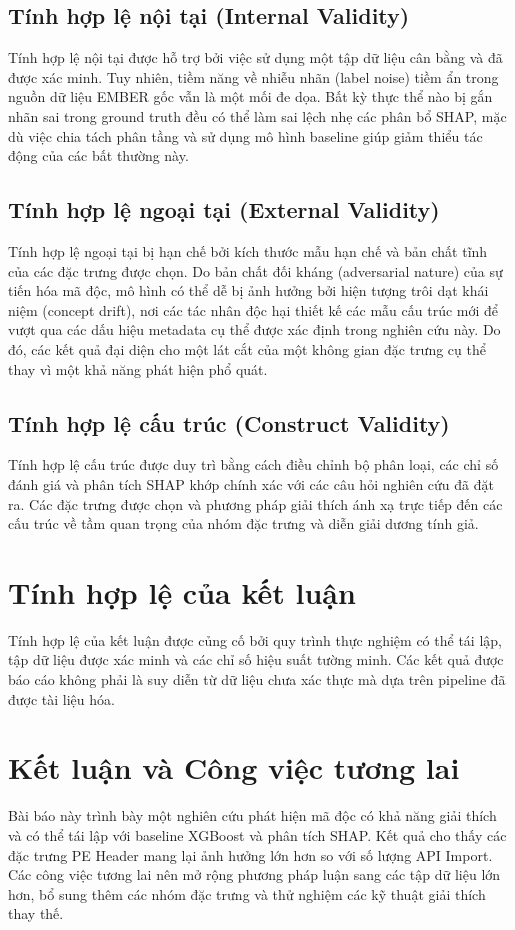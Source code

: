 \documentclass[conference]{IEEEtran}
\begin{document}
\subsection{Tính hợp lệ nội tại (Internal Validity)}
Tính hợp lệ nội tại được hỗ trợ bởi việc sử dụng một tập dữ liệu cân bằng và đã được xác minh. Tuy nhiên, tiềm năng về nhiễu nhãn (label noise) tiềm ẩn trong nguồn dữ liệu EMBER gốc vẫn là một mối đe dọa. Bất kỳ thực thể nào bị gắn nhãn sai trong ground truth đều có thể làm sai lệch nhẹ các phân bổ SHAP, mặc dù việc chia tách phân tầng và sử dụng mô hình baseline giúp giảm thiểu tác động của các bất thường này.

\subsection{Tính hợp lệ ngoại tại (External Validity)}
Tính hợp lệ ngoại tại bị hạn chế bởi kích thước mẫu hạn chế và bản chất tĩnh của các đặc trưng được chọn. Do bản chất đối kháng (adversarial nature) của sự tiến hóa mã độc, mô hình có thể dễ bị ảnh hưởng bởi hiện tượng trôi dạt khái niệm (concept drift), nơi các tác nhân độc hại thiết kế các mẫu cấu trúc mới để vượt qua các dấu hiệu metadata cụ thể được xác định trong nghiên cứu này. Do đó, các kết quả đại diện cho một lát cắt của một không gian đặc trưng cụ thể thay vì một khả năng phát hiện phổ quát.

\subsection{Tính hợp lệ cấu trúc (Construct Validity)}
Tính hợp lệ cấu trúc được duy trì bằng cách điều chỉnh bộ phân loại, các chỉ số đánh giá và phân tích SHAP khớp chính xác với các câu hỏi nghiên cứu đã đặt ra. Các đặc trưng được chọn và phương pháp giải thích ánh xạ trực tiếp đến các cấu trúc về tầm quan trọng của nhóm đặc trưng và diễn giải dương tính giả.

\section{Tính hợp lệ của kết luận}
Tính hợp lệ của kết luận được củng cố bởi quy trình thực nghiệm có thể tái lập, tập dữ liệu được xác minh và các chỉ số hiệu suất tường minh. Các kết quả được báo cáo không phải là suy diễn từ dữ liệu chưa xác thực mà dựa trên pipeline đã được tài liệu hóa.

\section{Kết luận và Công việc tương lai}
Bài báo này trình bày một nghiên cứu phát hiện mã độc có khả năng giải thích và có thể tái lập với baseline XGBoost và phân tích SHAP. Kết quả cho thấy các đặc trưng PE Header mang lại ảnh hưởng lớn hơn so với số lượng API Import. Các công việc tương lai nên mở rộng phương pháp luận sang các tập dữ liệu lớn hơn, bổ sung thêm các nhóm đặc trưng và thử nghiệm các kỹ thuật giải thích thay thế.
\end{document}
